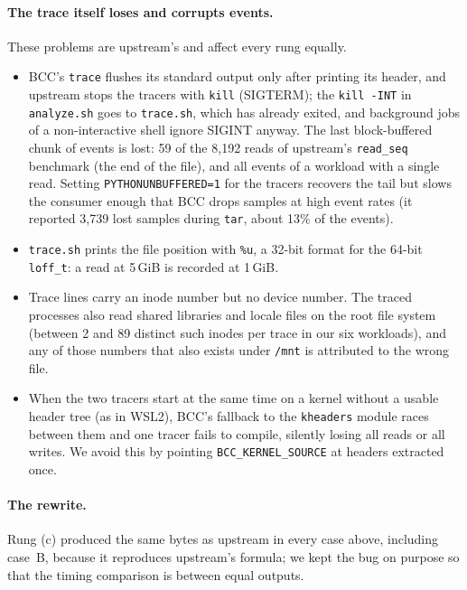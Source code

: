 \paragraph{The trace itself loses and corrupts events.}
These problems are upstream's and affect every rung equally.
\begin{itemize}
\item BCC's \texttt{trace} flushes its standard output only after printing its header,
  and upstream stops the tracers with \texttt{kill} (SIGTERM); the \texttt{kill -INT}
  in \texttt{analyze.sh} goes to \texttt{trace.sh}, which has already exited, and
  background jobs of a non-interactive shell ignore SIGINT anyway. The last
  block-buffered chunk of events is lost: 59 of the 8{,}192 reads of upstream's
  \texttt{read\_seq} benchmark (the end of the file), and all events of a workload
  with a single read. Setting \texttt{PYTHON\allowbreak UNBUFFERED=1} for the tracers recovers
  the tail but slows the consumer enough that BCC drops samples at high event rates
  (it reported 3{,}739 lost samples during \texttt{tar}, about 13\% of the events).
\item \texttt{trace.sh} prints the file position with \texttt{\%u}, a 32-bit format
  for the 64-bit \texttt{loff\_t}: a read at 5\,GiB is recorded at 1\,GiB.
\item Trace lines carry an inode number but no device number. The traced processes
  also read shared libraries and locale files on the root file system (between 2
  and 89 distinct such inodes per trace in our six workloads), and any of those numbers that
  also exists under \texttt{/mnt} is attributed to the wrong file.
\item When the two tracers start at the same time on a kernel without a usable
  header tree (as in WSL2), BCC's fallback to the \texttt{kheaders} module races
  between them and one tracer fails to compile, silently losing all reads or all
  writes. We avoid this by pointing \texttt{BCC\_KERNEL\_SOURCE} at headers
  extracted once.
\end{itemize}

\paragraph{The rewrite.}
Rung (c) produced the same bytes as upstream in every case above, including
case~B, because it reproduces upstream's formula; we kept the bug on purpose so that
the timing comparison is between equal outputs.
